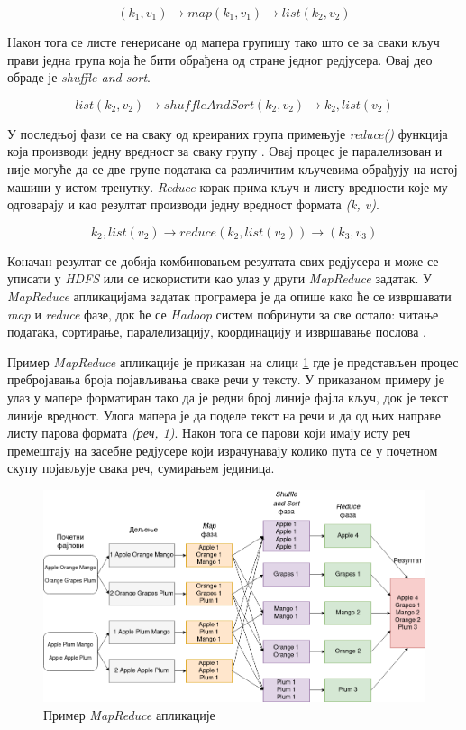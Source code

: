 \documentclass[12pt,oneside]{memoir}
\begin{document}
$$ (k_1, v_1) \rightarrow map(k_1, v_1) \rightarrow list(k_2, v_2) $$

Након тога се листе генерисане од мапера групишу тако што се за сваки кључ прави једна група која ће бити обрађена од стране једног редјусера. Овај део обраде је \textit{shuffle and sort}. 

$$ list(k_2, v_2) \rightarrow shuffleAndSort(k_2, v_2) \rightarrow k_2, list(v_2) $$

У последњој фази се на сваку од креираних група примењује \textit{reduce()} функција која производи једну вредност за сваку групу \cite{hadoop_learning}. Овај процес је паралелизован и није могуће да се две групе података са различитим кључевима обрађују на истој машини у истом тренутку. \textit{Reduce} корак прима кључ и листу вредности које му одговарају и као резултат производи једну вредност формата \textit{(k, v)}.

$$ k_2, list(v_2) \rightarrow reduce(k_2, list(v_2)) \rightarrow (k_3, v_3) $$

Коначан резултат се добија комбиновањем резултата свих редјусера и може се уписати у \textit{HDFS} или се искористити као улаз у други \textit{MapReduce} задатак. У \textit{MapReduce} апликацијама задатак програмера је да опише како ће се извршавати \textit{map} и \textit{reduce} фазе, док ће се \textit{Hadoop} систем побринути за све остало: читање података, сортирање, паралелизацију, координацију и извршавање послова \cite{hadoop_beginner}.

Пример \textit{MapReduce} апликације је приказан на слици \ref{fig:map_reduce} где је представљен процес пребројавања броја појављивања сваке речи у тексту. У приказаном примеру је улаз у мапере форматиран тако да је редни број линије фајла кључ, док је текст линије вредност. Улога мапера је да поделе текст на речи и да од њих направе листу парова формата \textit{(реч, 1)}. Након тога се парови који имају исту реч премештају на засебне редјусере који израчунавају колико пута се у почетном скупу појављује свака реч, сумирањем јединица.

\begin{figure}[!ht]
  \centering
  \includegraphics[width=1\textwidth]{pictures/mr_example_wordcount.png}
  \caption{Пример \textit{MapReduce} апликације}
  \label{fig:map_reduce}
\end{figure}
\end{document}
